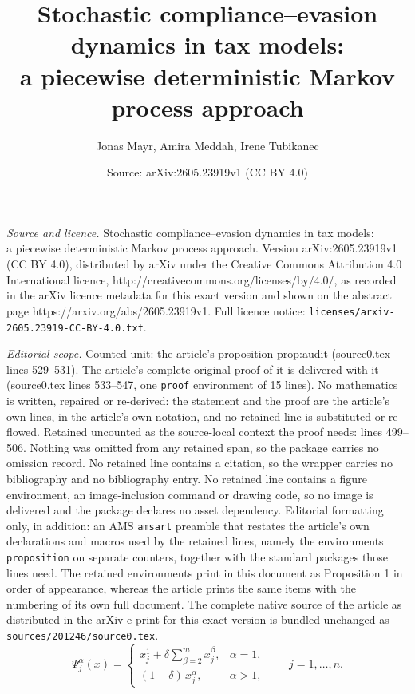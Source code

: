 \documentclass[10pt,a4paper]{amsart}
\title{Stochastic compliance–evasion dynamics in tax models:\\ a piecewise deterministic Markov process approach}
\author{Jonas Mayr, Amira Meddah, Irene Tubikanec}
\date{Source: arXiv:2605.23919v1 (CC BY 4.0)}
\begin{document}
\maketitle

\noindent\emph{Source and licence.} Stochastic compliance–evasion dynamics in tax models:\\ a piecewise deterministic Markov process approach. Version arXiv:2605.23919v1 (CC BY 4.0), distributed by arXiv under the Creative Commons Attribution 4.0 International licence, http://creativecommons.org/licenses/by/4.0/, as recorded in the arXiv licence metadata for this exact version and shown on the abstract page https://arxiv.org/abs/2605.23919v1. Full licence notice: \texttt{licenses/arxiv-2605.23919-CC-BY-4.0.txt}.\par\smallskip

\noindent\textit{Editorial scope.} Counted unit: the article's proposition prop:audit (source0.tex lines 529--531). The article's complete original proof of it is delivered with it (source0.tex lines 533--547, one \texttt{proof} environment of 15 lines). No mathematics is written, repaired or re-derived: the statement and the proof are the article's own lines, in the article's own notation, and no retained line is substituted or re-flowed.  Retained uncounted as the source-local context the proof needs: lines 499--506.  Nothing was omitted from any retained span, so the package carries no omission record.  No retained line contains a citation, so the wrapper carries no bibliography and no bibliography entry.  No retained line contains a figure environment, an image-inclusion command or drawing code, so no image is delivered and the package declares no asset dependency.  Editorial formatting only, in addition: an AMS \texttt{amsart} preamble that restates the article's own declarations and macros used by the retained lines, namely the environments \texttt{proposition} on separate counters, together with the standard packages those lines need.  The retained environments print in this document as Proposition 1 in order of appearance, whereas the article prints the same items with the numbering of its own full document.  The complete native source of the article as distributed in the arXiv e-print for this exact version is bundled unchanged as \texttt{sources/201246/source0.tex}.
\begin{equation}\label{audit_map}
  \Psi^\alpha_j(x) =
  \begin{cases}
    x^1_j + \delta \displaystyle\sum_{\beta=2}^m x^\beta_j, & \alpha = 1, \\[1.5ex]
    (1-\delta)\,x^\alpha_j, & \alpha > 1,
  \end{cases}
  \qquad j = 1, \dots, n.
\end{equation}
\end{document}
